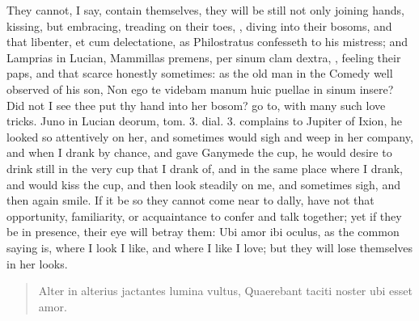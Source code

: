 They cannot, I say, contain themselves, they will be still not only
joining hands, kissing, but embracing, treading on their toes, \etc{},
diving into their bosoms, and that libenter, et cum delectatione, as
 Philostratus confesseth to his mistress; and Lamprias in Lucian,
Mammillas premens, per sinum clam dextra, \etc{}, feeling their paps, and
that scarce honestly sometimes: as the old man in the Comedy well
observed of his son, Non ego te videbam manum huic puellae in sinum
insere? Did not I see thee put thy hand into her bosom? go to, with
many such love tricks. Juno in Lucian deorum, tom. 3. dial. 3.
complains to Jupiter of Ixion, he looked so attentively on her,
and sometimes would sigh and weep in her company, and when I drank by
chance, and gave Ganymede the cup, he would desire to drink still in
the very cup that I drank of, and in the same place where I drank, and
would kiss the cup, and then look steadily on me, and sometimes sigh,
and then again smile. If it be so they cannot come near to dally, have
not that opportunity, familiarity, or acquaintance to confer and talk
together; yet if they be in presence, their eye will betray them: Ubi
amor ibi oculus, as the common saying is, where I look I like, and
where I like I love; but they will lose themselves in her looks.

\begin{latin}
\begin{verse}
Alter in alterius jactantes lumina vultus,
Quaerebant taciti noster ubi esset amor.
\end{verse}
\end{latin}

